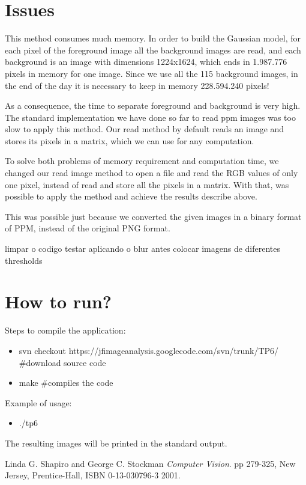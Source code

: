 \documentclass{article}
\begin{document}
\section{Issues}
	This method consumes much memory. In order to build the Gaussian model, for each pixel of the foreground image all the background images are read, and each background is an image with dimensions 1224x1624, which ends in 1.987.776 pixels in memory for one image. Since we use all the 115 background images, in the end of the day it is necessary to keep in memory 228.594.240 pixels!

	As a consequence, the time to separate foreground and background is very high. The standard implementation we have done so far to read ppm images was too slow to apply this method. Our read method by default reads an image and stores its pixels in a matrix, which we can use for any computation.

	To solve both problems of memory requirement and computation time, we changed our read image method to open a file and read the RGB values of only one pixel, instead of read and store all the pixels in a matrix. With that, was possible to apply the method and achieve the results describe above.

	This was possible just because we converted the given images in a binary format of PPM, instead of the original PNG format.



	limpar o codigo
	testar aplicando o blur antes
	colocar imagens de diferentes thresholds



\section{How to run?}

	Steps to compile the application:
	
	\begin{itemize}
		\item svn checkout https://jfimageanalysis.googlecode.com/svn/trunk/TP6/ \#download source code
		\item make \#compiles the code
	\end{itemize}


	Example of usage:

	\begin{itemize}
		\item ./tp6
	\end{itemize}

	The resulting images will be printed in the standard output.


\begin{thebibliography}{9}

	Linda G. Shapiro and George C. Stockman
 	\emph{Computer Vision}.
	pp 279-325, 
	New Jersey, Prentice-Hall, 
	ISBN 0-13-030796-3
 	2001.

\end{thebibliography}
\end{document}
